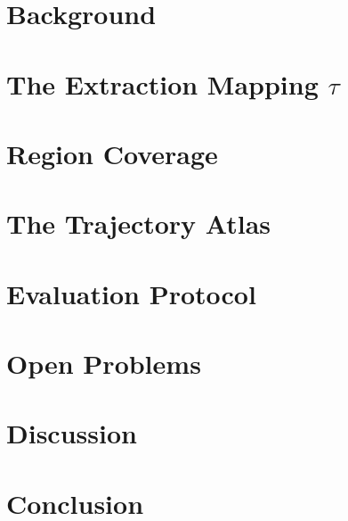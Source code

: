 \documentclass[11pt,a4paper]{article}
\theoremstyle{definition}
\begin{document}
\section{Background}
\label{sec:background}


\section{The Extraction Mapping $\tau$}
\label{sec:extraction}


\section{Region Coverage}
\label{sec:coverage}


\section{The Trajectory Atlas}
\label{sec:atlas}


\section{Evaluation Protocol}
\label{sec:evaluation}


\section{Open Problems}
\label{sec:open_problems}


\section{Discussion}
\label{sec:discussion}


\section{Conclusion}
\label{sec:conclusion}




\end{document}
